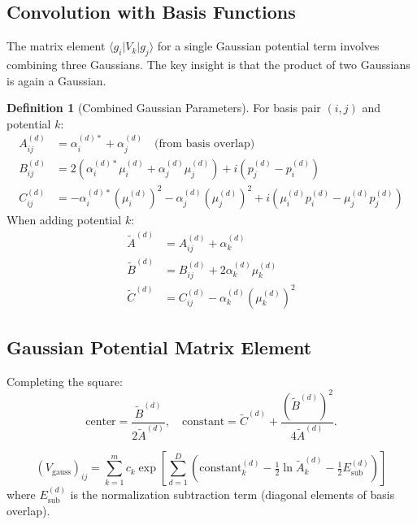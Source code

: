 \documentclass[11pt,a4paper]{article}
\newcommand{\half}{\tfrac{1}{2}}
\theoremstyle{definition}
\newtheorem{definition}{Definition}
\begin{document}
\subsection{Convolution with Basis Functions}

The matrix element $\langle g_i | V_k | g_j \rangle$ for a single Gaussian potential term involves combining three Gaussians. The key insight is that the product of two Gaussians is again a Gaussian.

\begin{definition}[Combined Gaussian Parameters]
For basis pair $(i,j)$ and potential $k$:
\begin{align}
A_{ij}^{(d)} &= \alpha_i^{(d)*} + \alpha_j^{(d)} \quad \text{(from basis overlap)} \\
B_{ij}^{(d)} &= 2(\alpha_i^{(d)*} \mu_i^{(d)} + \alpha_j^{(d)} \mu_j^{(d)}) + i(p_j^{(d)} - p_i^{(d)}) \\
C_{ij}^{(d)} &= -\alpha_i^{(d)*} (\mu_i^{(d)})^2 - \alpha_j^{(d)} (\mu_j^{(d)})^2 + i(\mu_i^{(d)} p_i^{(d)} - \mu_j^{(d)} p_j^{(d)})
\end{align}
When adding potential $k$:
\begin{align}
\tilde{A}^{(d)} &= A_{ij}^{(d)} + \alpha_k^{(d)} \\
\tilde{B}^{(d)} &= B_{ij}^{(d)} + 2\alpha_k^{(d)} \mu_k^{(d)} \\
\tilde{C}^{(d)} &= C_{ij}^{(d)} - \alpha_k^{(d)} (\mu_k^{(d)})^2
\end{align}
\end{definition}

\subsection{Gaussian Potential Matrix Element}

Completing the square:
\begin{equation}
\text{center} = \frac{\tilde{B}^{(d)}}{2\tilde{A}^{(d)}}, \quad
\text{constant} = \tilde{C}^{(d)} + \frac{(\tilde{B}^{(d)})^2}{4\tilde{A}^{(d)}}.
\end{equation}

\begin{tcolorbox}[colback=red!5,colframe=red!50!black,title=Gaussian Potential Matrix]
\begin{equation}
(V_{\text{gauss}})_{ij} = \sum_{k=1}^{m} c_k \exp\left[ \sum_{d=1}^{D} \left( \text{constant}_k^{(d)} - \half \ln \tilde{A}_k^{(d)} - \half E_{\text{sub}}^{(d)} \right) \right]
\end{equation}
where $E_{\text{sub}}^{(d)}$ is the normalization subtraction term (diagonal elements of basis overlap).
\end{tcolorbox}
\end{document}
